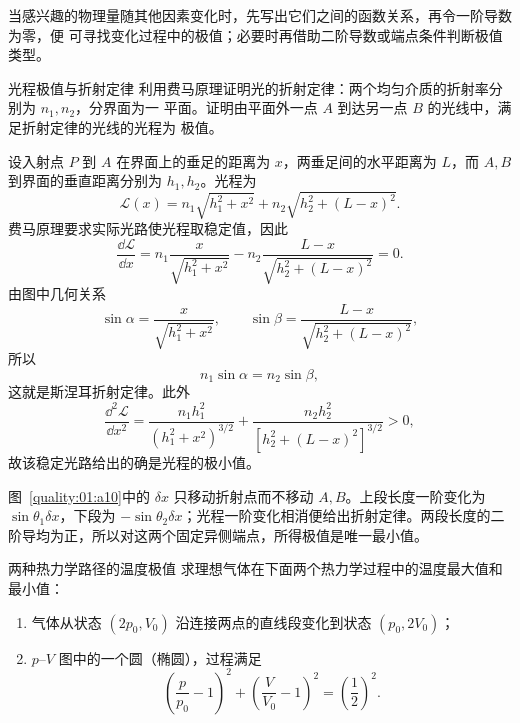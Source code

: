 {当感兴趣的物理量随其他因素变化时，先写出它们之间的函数关系，再令一阶导数为零，便
可寻找变化过程中的极值；必要时再借助二阶导数或端点条件判断极值类型。

\begin{origexamplebox}{光程极值与折射定律}\label{ch01:ex:s14-1-6}
利用费马原理证明光的折射定律：两个均匀介质的折射率分别为 $n_1,n_2$，分界面为一
平面。证明由平面外一点 $A$ 到达另一点 $B$ 的光线中，满足折射定律的光线的光程为
极值。
\end{origexamplebox}

\begin{xesolution}
设入射点 $P$ 到 $A$ 在界面上的垂足的距离为 $x$，两垂足间的水平距离为 $L$，而 $A,B$
到界面的垂直距离分别为 $h_1,h_2$。光程为
\[
 \mathcal L(x)=n_1\sqrt{h_1^2+x^2}
 +n_2\sqrt{h_2^2+(L-x)^2}.
\]
费马原理要求实际光路使光程取稳定值，因此
\[
 \frac{\dd\mathcal L}{\dd x}
 =n_1\frac{x}{\sqrt{h_1^2+x^2}}
 -n_2\frac{L-x}{\sqrt{h_2^2+(L-x)^2}}=0.
\]
由图中几何关系
\[
 \sin\alpha=\frac{x}{\sqrt{h_1^2+x^2}},\qquad
 \sin\beta=\frac{L-x}{\sqrt{h_2^2+(L-x)^2}},
\]
所以
\[
 \boxed{n_1\sin\alpha=n_2\sin\beta},
\]
这就是斯涅耳折射定律。此外
\[
 \frac{\dd^2\mathcal L}{\dd x^2}
 =\frac{n_1h_1^2}{(h_1^2+x^2)^{3/2}}
 +\frac{n_2h_2^2}{[h_2^2+(L-x)^2]^{3/2}}>0,
\]
故该稳定光路给出的确是光程的极小值。


图~\ref{quality:01:a10}中的 $\delta x$ 只移动折射点而不移动 $A,B$。上段长度一阶变化为 $\sin\theta_1\delta x$，下段为 $-\sin\theta_2\delta x$；光程一阶变化相消便给出折射定律。两段长度的二阶导均为正，所以对这两个固定异侧端点，所得极值是唯一最小值。
\end{xesolution}

\begin{origexamplebox}{两种热力学路径的温度极值}\label{ch01:ex:s14-1-7}
求理想气体在下面两个热力学过程中的温度最大值和最小值：
\begin{enumerate}[label=(\alph*),leftmargin=2.2em]
 \item 气体从状态 $(2p_0,V_0)$ 沿连接两点的直线段变化到状态 $(p_0,2V_0)$；
 \item $p$--$V$ 图中的一个圆（椭圆），过程满足
 \[
  \left(\frac p{p_0}-1\right)^2+
  \left(\frac V{V_0}-1\right)^2=\left(\frac12\right)^2.
 \]
\end{enumerate}
\end{origexamplebox}

}
